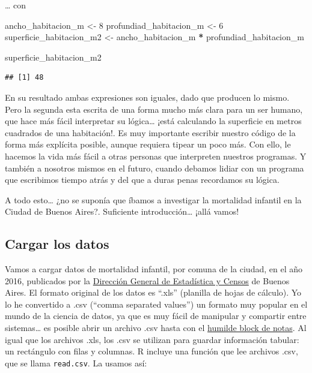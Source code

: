 \documentclass[spanish,]{book}
\newenvironment{Shaded}{\begin{snugshade}}{\end{snugshade}}
\newcommand{\DecValTok}[1]{\textcolor[rgb]{0.00,0.00,0.81}{#1}}
\newcommand{\NormalTok}[1]{#1}
\newcommand{\OperatorTok}[1]{\textcolor[rgb]{0.81,0.36,0.00}{\textbf{#1}}}
\newcommand{\StringTok}[1]{\textcolor[rgb]{0.31,0.60,0.02}{#1}}
\begin{document}
\ldots{} con

\begin{Shaded}
\begin{Highlighting}[]
\NormalTok{ancho_habitacion_m <-}\StringTok{ }\DecValTok{8}
\NormalTok{profundiad_habitacion_m <-}\StringTok{ }\DecValTok{6}
\NormalTok{superficie_habitacion_m2 <-}\StringTok{ }\NormalTok{ancho_habitacion_m }\OperatorTok{*}\StringTok{ }\NormalTok{profundiad_habitacion_m}

\NormalTok{superficie_habitacion_m2}
\end{Highlighting}
\end{Shaded}

\begin{verbatim}
## [1] 48
\end{verbatim}

En su resultado ambas expresiones son iguales, dado que producen lo mismo. Pero la segunda esta escrita de una forma mucho más clara para un ser humano, que hace más fácil interpretar su lógica\ldots{} ¡está calculando la superficie en metros cuadrados de una habitación!. Es muy importante escribir nuestro código de la forma más explícita posible, aunque requiera tipear un poco más. Con ello, le hacemos la vida más fácil a otras personas que interpreten nuestros programas. Y también a nosotros mismos en el futuro, cuando debamos lidiar con un programa que escribimos tiempo atrás y del que a duras penas recordamos su lógica.

A todo esto\ldots{} ¿no se suponía que íbamos a investigar la mortalidad infantil en la Ciudad de Buenos Aires?. Suficiente introducción\ldots{} ¡allá vamos!

\hypertarget{cargar-los-datos}{%
\subsection{Cargar los datos}\label{cargar-los-datos}}

Vamos a cargar datos de mortalidad infantil, por comuna de la ciudad, en el año 2016, publicados por la \href{https://www.estadisticaciudad.gob.ar/eyc/}{Dirección General de Estadística y Censos} de Buenos Aires. El formato original de los datos es ``.xls'' (planilla de hojas de cálculo). Yo lo he convertido a .csv (``comma separated values'') un formato muy popular en el mundo de la ciencia de datos, ya que es muy fácil de manipular y compartir entre sistemas\ldots{} es posible abrir un archivo .csv hasta con el \href{https://es.wikipedia.org/wiki/Bloc_de_notas}{humilde block de notas}. Al igual que los archivos .xls, los .csv se utilizan para guardar información tabular: un rectángulo con filas y columnas. R incluye una función que lee archivos .csv, que se llama \texttt{read.csv}. La usamos así:
\end{document}
